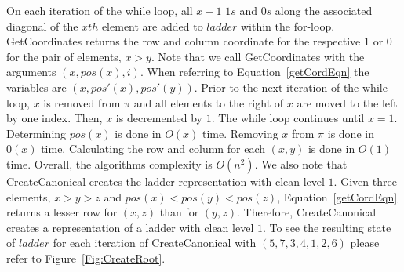 On each iteration of the while loop, all $x-1$ $1s$ and $0s$  along the associated diagonal of the $xth$ 
element are added to $ladder$ within the for-loop. {\sc GetCoordinates} returns the row and column coordinate 
for the respective $1$ or $0$ for the pair of elements, $x>y$. Note that we call {\sc GetCoordinates} with 
the arguments $(x,pos(x),i)$. When referring to Equation~\ref{getCordEqn} the variables 
are $(x,pos'(x),pos'(y))$. Prior to the next iteration of the while loop, 
$x$ is removed from $\pi$ and all elements to the right of $x$ are moved to the left by one index. 
Then, $x$ is decremented by $1$. The while loop continues until $x=1$. Determining $pos(x)$ 
is done in $O(x)$ time. Removing $x$ from $\pi$ is done in $0(x)$ time. Calculating the row and column 
for each $(x,y)$ is done in $O(1)$ time. Overall, the algorithms complexity is $O(n^2)$.
We also note that {\sc CreateCanonical} creates the ladder representation with clean level $1$.  
Given three elements, $x>y>z$ and $pos(x) < pos(y) < pos(z)$, Equation~\ref{getCordEqn} returns a lesser row 
for $(x,z)$ than for $(y,z)$. Therefore, {\sc CreateCanonical} creates a representation of a ladder with clean level $1$. 
To see the resulting state of $ladder$ for each iteration of {\sc CreateCanonical} with $(5,7,3,4,1,2,6)$ please refer to Figure~\ref{Fig:CreateRoot}. 
